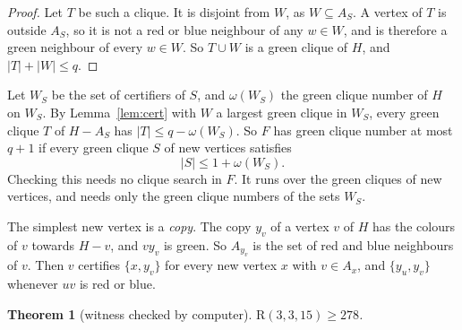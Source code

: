 \documentclass[11pt]{article}
\theoremstyle{spacedplain}
\newtheorem{theorem}{Theorem}[section]
\theoremstyle{spaceddef}
\theoremstyle{spacedremark}
\newcommand{\R}{\mathrm{R}}
\begin{document}
\begin{proof}
Let $T$ be such a clique.
It is disjoint from $W$, as $W\subseteq A_S$.
A vertex of $T$ is outside $A_S$, so it is not a red or blue neighbour of any $w\in W$, and is therefore a green neighbour of every $w\in W$.
So $T\cup W$ is a green clique of $H$, and $|T|+|W|\le q$.
\end{proof}

Let $W_S$ be the set of certifiers of $S$, and $\omega(W_S)$ the green clique number of $H$ on $W_S$.
By Lemma~\ref{lem:cert} with $W$ a largest green clique in $W_S$, every green clique $T$ of $H-A_S$ has $|T|\le q-\omega(W_S)$.
So $F$ has green clique number at most $q+1$ if every green clique $S$ of new vertices satisfies
\[
|S|\le 1+\omega(W_S).
\]
Checking this needs no clique search in $F$.
It runs over the green cliques of new vertices, and needs only the green clique numbers of the sets $W_S$.

The simplest new vertex is a \emph{copy}.
The copy $y_v$ of a vertex $v$ of $H$ has the colours of $v$ towards $H-v$, and $vy_v$ is green.
So $A_{y_v}$ is the set of red and blue neighbours of $v$.
Then $v$ certifies $\{x,y_v\}$ for every new vertex $x$ with $v\in A_x$, and $\{y_u,y_v\}$ whenever $uv$ is red or blue.

\begin{theorem}[witness checked by computer]\label{thm:ext15}
$\R(3,3,15)\ge 278$.
\end{theorem}
\end{document}

